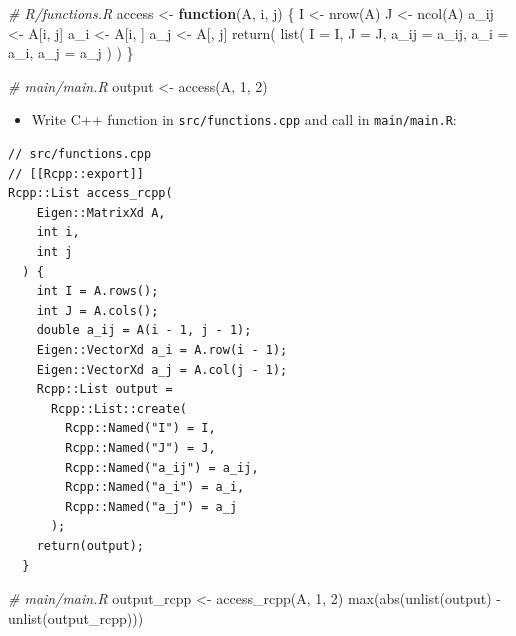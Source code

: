 \documentclass[
]{book}
\newenvironment{Shaded}{\begin{snugshade}}{\end{snugshade}}
\newcommand{\AttributeTok}[1]{\textcolor[rgb]{0.77,0.63,0.00}{#1}}
\newcommand{\CommentTok}[1]{\textcolor[rgb]{0.56,0.35,0.01}{\textit{#1}}}
\newcommand{\ControlFlowTok}[1]{\textcolor[rgb]{0.13,0.29,0.53}{\textbf{#1}}}
\newcommand{\DecValTok}[1]{\textcolor[rgb]{0.00,0.00,0.81}{#1}}
\newcommand{\FunctionTok}[1]{\textcolor[rgb]{0.00,0.00,0.00}{#1}}
\newcommand{\NormalTok}[1]{#1}
\newcommand{\OtherTok}[1]{\textcolor[rgb]{0.56,0.35,0.01}{#1}}
\newcommand{\SpecialCharTok}[1]{\textcolor[rgb]{0.00,0.00,0.00}{#1}}
\providecommand{\tightlist}{%
  \setlength{\itemsep}{0pt}\setlength{\parskip}{0pt}}
\begin{document}
\begin{Shaded}
\begin{Highlighting}[]
\CommentTok{\# R/functions.R}
\NormalTok{access }\OtherTok{\textless{}{-}} 
  \ControlFlowTok{function}\NormalTok{(A, i, j) \{}
\NormalTok{    I }\OtherTok{\textless{}{-}} \FunctionTok{nrow}\NormalTok{(A)}
\NormalTok{    J }\OtherTok{\textless{}{-}} \FunctionTok{ncol}\NormalTok{(A)}
\NormalTok{    a\_ij }\OtherTok{\textless{}{-}}\NormalTok{ A[i, j]}
\NormalTok{    a\_i }\OtherTok{\textless{}{-}}\NormalTok{ A[i, ]}
\NormalTok{    a\_j }\OtherTok{\textless{}{-}}\NormalTok{ A[, j]}
    \FunctionTok{return}\NormalTok{(}
      \FunctionTok{list}\NormalTok{(}
        \AttributeTok{I =}\NormalTok{ I,}
        \AttributeTok{J =}\NormalTok{ J,}
        \AttributeTok{a\_ij =}\NormalTok{ a\_ij,}
        \AttributeTok{a\_i =}\NormalTok{ a\_i,}
        \AttributeTok{a\_j =}\NormalTok{ a\_j}
\NormalTok{      )}
\NormalTok{    )}
\NormalTok{  \}}
\end{Highlighting}
\end{Shaded}

\begin{Shaded}
\begin{Highlighting}[]
\CommentTok{\# main/main.R}
\NormalTok{output }\OtherTok{\textless{}{-}} \FunctionTok{access}\NormalTok{(A, }\DecValTok{1}\NormalTok{, }\DecValTok{2}\NormalTok{)}
\end{Highlighting}
\end{Shaded}

\begin{itemize}
\tightlist
\item
  Write C++ function in \texttt{src/functions.cpp} and call in \texttt{main/main.R}:
\end{itemize}

\begin{verbatim}
// src/functions.cpp
// [[Rcpp::export]]
Rcpp::List access_rcpp(
    Eigen::MatrixXd A, 
    int i, 
    int j
  ) {
    int I = A.rows();
    int J = A.cols();
    double a_ij = A(i - 1, j - 1);
    Eigen::VectorXd a_i = A.row(i - 1);
    Eigen::VectorXd a_j = A.col(j - 1);
    Rcpp::List output =
      Rcpp::List::create(
        Rcpp::Named("I") = I,
        Rcpp::Named("J") = J,
        Rcpp::Named("a_ij") = a_ij,
        Rcpp::Named("a_i") = a_i,
        Rcpp::Named("a_j") = a_j
      );
    return(output);
  }
\end{verbatim}

\begin{Shaded}
\begin{Highlighting}[]
\CommentTok{\# main/main.R}
\NormalTok{output\_rcpp }\OtherTok{\textless{}{-}} \FunctionTok{access\_rcpp}\NormalTok{(A, }\DecValTok{1}\NormalTok{, }\DecValTok{2}\NormalTok{)}
\FunctionTok{max}\NormalTok{(}\FunctionTok{abs}\NormalTok{(}\FunctionTok{unlist}\NormalTok{(output) }\SpecialCharTok{{-}} \FunctionTok{unlist}\NormalTok{(output\_rcpp)))}
\end{Highlighting}
\end{Shaded}
\end{document}
